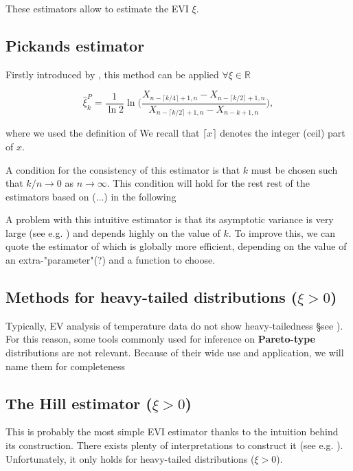 These estimators allow to estimate the EVI $\xi$. 

\subsection*{Pickands estimator}


Firstly introduced by \cite{pickands_statistical_1975}, this method can be applied $\forall\xi\in\mathbb{R}$

\begin{equation}
\hat{\xi}^P_{k}= \frac{1}{\ln 2}\ln \Bigg(\frac{X_{n-\lceil k/4\rceil +1,n}-X_{n-\lceil k/2\rceil+1,n}}{X_{n-\lceil k/2\rceil +1,n}-X_{n-k+1,n}}\Bigg),
\end{equation}

where we used the definition of \citet{beirlant_statistics_2006}
We recall that $\lceil x\rceil$ denotes the integer (ceil) part of $x$.

A condition for the consistency of this estimator is that $k$ must be chosen such that $k/n\rightarrow 0$ as $n\rightarrow \infty$. This condition will hold for the rest rest of the estimators based on (...) in the following 

A problem with this intuitive estimator is that its asymptotic variance is very large (see e.g. \cite{dekkers_estimation_1989}) and depends highly on the value of $k$. To improve this, we can quote the estimator of \cite{segers_generalized_2001} which is globally more efficient, depending on the value of an extra-"parameter"(?) and a function to choose.


\subsection*{Methods for heavy-tailed distributions ($\xi>0$)}

Typically, EV analysis of temperature data do not show heavy-tailedness §see \citet{}). For this reason, some tools commonly used for inference on \textbf{Pareto-type} distributions are not relevant. Because of their wide use and application, we will name them for completeness


\subsection*{The Hill estimator ($\xi>0$)}


This is probably the most simple EVI estimator thanks to the intuition behind its construction. There exists plenty of interpretations to construct it (see e.g. \citet[pp.101-104]{beirlant_statistics_2006}). Unfortunately, it only holds for heavy-tailed distributions ($\xi>0$). 


